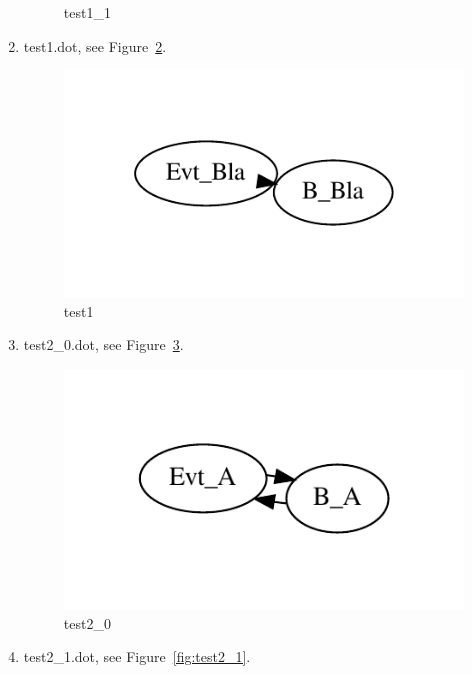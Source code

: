 \documentclass[12pt,a4paper]{report}
\begin{document}
\begin{enumerate}
\begin{figure}
        \caption{test1\_1}
        \label{fig:test1_1}
    \end{figure}
\item test1.dot, see Figure~\ref{fig:test1}.
    \begin{figure}
        \centering
        \includegraphics*[width=1.0\textwidth,keepaspectratio]{TestPattern/test1.pdf}
        \caption{test1}
        \label{fig:test1}
    \end{figure}
\item test2\_0.dot, see Figure~\ref{fig:test2_0}.
    \begin{figure}
        \centering
        \includegraphics*[width=1.0\textwidth,keepaspectratio]{TestPattern/test2_0.pdf}
        \caption{test2\_0}
        \label{fig:test2_0}
    \end{figure}
\item test2\_1.dot, see Figure~\ref{fig:test2_1}.
    \begin{figure}
        \centering

\end{figure}
\end{enumerate}
\end{document}
